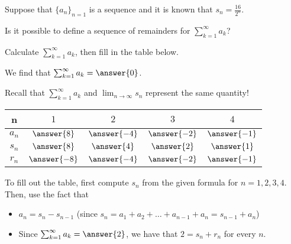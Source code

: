 \documentclass{ximera}
\author{Jim Talamo}
\begin{document}
\begin{exercise}

Suppose that $\{a_n\}_{n=1}$ is a sequence and it is known that $s_n = \frac{16}{2^n}$.

Is it possible to define a sequence of remainders for $\sum_{k=1}^{\infty} a_k$?

\begin{multipleChoice}
\end{multipleChoice}

\begin{exercise}
Calculate $\sum_{k=1}^{\infty} a_k$, then fill in the table below.

We find that $\sum_{k=1}^{\infty} a_k = \answer{0}$.

\begin{hint}
Recall that $\sum_{k=1}^{\infty} a_k$ and $\lim_{n \to \infty} s_n$ represent the same quantity!
\end{hint}

\begin{center}
\begin{tabular}{c | c | c | c | c }
n& $1$ & $2$ & $3$ & $4$ \\ [2 ex]
\hline
$a_n$ & $ \answer{8}$ &$ \answer{-4}$ & $ \answer{-2}$ & $ \answer{-1}$  \\ [2 ex]
\hline
$s_n$ & $ \answer{8}$ &$ \answer{4}$ & $ \answer{2}$ & $ \answer{1}$  \\ [2 ex]
\hline
$r_n$ & $ \answer{-8}$ & $ \answer{-4}$ & $ \answer{-2}$ & $ \answer{-1}$ 
\end{tabular}
\end{center}

\begin{hint}
To fill out the table, first compute $s_n$ from the given formula for $n=1,2,3,4$.  Then, use the fact that

\begin{itemize}
\item $a_n = s_n-s_{n-1}$ (since $s_n = a_1+a_2+\ldots+a_{n-1}+a_n = s_{n-1}+a_n$)
\item Since  $\sum_{k=1}^{\infty} a_k = \answer{2}$, we have that $2=s_n+r_n$ for every $n$.
\end{itemize}
\end{hint}

\end{exercise}
\end{exercise}
\end{document}
